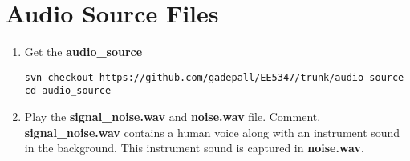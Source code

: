 \documentclass[journal,12pt,twocolumn]{IEEEtran}
\renewcommand\thesection{\arabic{section}}
\begin{document}
\section{Audio Source Files}
\begin{enumerate}[label=\thesection.\arabic*
,ref=\thesection.\theenumi]
\item Get the \textbf{audio\_source}
\begin{lstlisting}
svn checkout https://github.com/gadepall/EE5347/trunk/audio_source
cd audio_source
\end{lstlisting}
\item Play the \textbf{signal\_noise.wav} and \textbf{noise.wav} file. Comment.
\\
\solution
\textbf{signal\_noise.wav}  contains a human voice along 
with an instrument sound in the background.  This instrument sound
is captured in \textbf{noise.wav}.
\end{enumerate}
%
\end{document}
